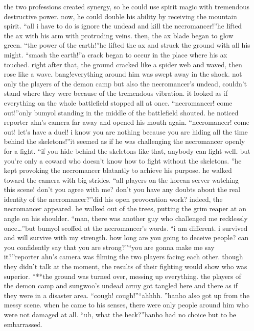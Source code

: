 the two professions created synergy, so he could use spirit magic with tremendous destructive power.
 now, he could double his ability by receiving the mountain spirit.
“all i have to do is ignore the undead and kill the necromancer!”he lifted the ax with his arm with protruding veins.
 then, the ax blade began to glow green.
“the power of the earth!”he lifted the ax and struck the ground with all his might.
“smash the earth!”a crack began to occur in the place where his ax touched.
right after that, the ground cracked like a spider web and waved, then rose like a wave.
bang!everything around him was swept away in the shock.
not only the players of the demon camp but also the necromancer’s undead, couldn’t stand where they were because of the tremendous vibration.
 it looked as if everything on the whole battlefield stopped all at once.
“necromancer! come out!”only bumyol standing in the middle of the battlefield shouted.
 he noticed reporter ahn’s camera far away and opened his mouth again.
“necromancer! come out! let’s have a duel! i know you are nothing because you are hiding all the time behind the skeletons!”it seemed as if he was challenging the necromancer openly for a fight.
“if you hide behind the skeletons like that, anybody can fight well.
 but you’re only a coward who doesn’t know how to fight without the skeletons.
”he kept provoking the necromancer blatantly to achieve his purpose.
 he walked toward the camera with big strides.
“all players on the korean server watching this scene! don’t you agree with me? don’t you have any doubts about the real identity of the necromancer?”did his open provocation work? indeed, the necromancer appeared.
 he walked out of the trees, putting the grim reaper at an angle on his shoulder.
“man, there was another guy who challenged me recklessly once…”but bumyol scoffed at the necromancer’s words.
“i am different.
 i survived and will survive with my strength.
 how long are you going to deceive people? can you confidently say that you are strong?”“you are gonna make me say it?”reporter ahn’s camera was filming the two players facing each other.
 though they didn’t talk at the moment, the results of their fighting would show who was superior.
***the ground was turned over, messing up everything.
 the players of the demon camp and sungwoo’s undead army got tangled here and there as if they were in a disaster area.
“cough! cough!”“ahhhh.
”hanho also got up from the messy scene.
 when he came to his senses, there were only people around him who were not damaged at all.
“uh, what the heck?”hanho had no choice but to be embarrassed.

